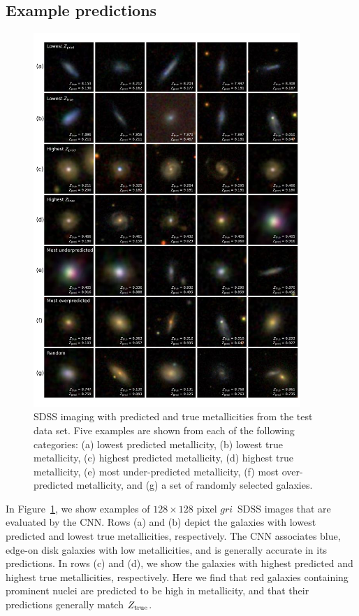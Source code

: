 \documentclass[fleqn,usenatbib]{mnras}
\newcommand{\sdssg}{\hbox{$g$}}
\newcommand{\sdssr}{\hbox{$r$}}
\newcommand{\sdssi}{\hbox{$i$}}
\begin{document}
\subsection{Example predictions}
\begin{figure}
	\includegraphics[width=0.9\textwidth]{01-prediction_examples.pdf}
	\caption{\label{fig:examples}
		SDSS imaging with predicted and true metallicities from the test data set. Five examples are shown from each of the following categories: (a) lowest predicted metallicity, (b) lowest true metallicity, (c) highest predicted metallicity, (d) highest true metallicity, (e) most under-predicted metallicity, (f) most over-predicted metallicity, and (g) a set of randomly selected galaxies.}
\end{figure}

In Figure~\ref{fig:examples}, we show examples of $128 \times 128$ pixel \sdssg\sdssr\sdssi\ SDSS images that are evaluated by the CNN. Rows (a) and (b) depict the galaxies with lowest predicted and lowest true metallicities, respectively. The CNN associates blue, edge-on disk galaxies with low metallicities, and is generally accurate in its predictions. In rows (c) and (d), we show the galaxies with highest predicted and highest true metallicities, respectively. Here we find that red galaxies containing prominent nuclei are predicted to be high in metallicity, and that their predictions generally match $Z_{\rm true}$.
\end{document}
